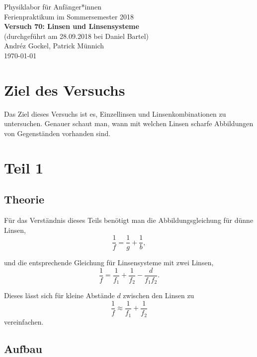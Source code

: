 \documentclass[11pt,a4paper]{article}
\begin{document}
{
\centering 
\large 
Physiklabor für Anf\"anger*innen \\
Ferienpraktikum im Sommersemester 2018 \\[4mm]
\textbf{\LARGE 
Versuch 70: Linsen und Linsensysteme
} \\[3mm]
(durchgef\"uhrt am 28.09.2018 bei Daniel Bartel) \\
Andréz Gockel, Patrick M\"unnich\\
\today \\[10mm]
}

\vspace{50pt}
\tableofcontents
\vspace{22pt}
\listoftables
\vspace{22pt}
\listoffigures
\pagebreak

\section{Ziel des Versuchs}

Das Ziel dieses Versuchs ist es, Einzellinsen und Linsenkombinationen zu untersuchen. Genauer schaut man, wann mit welchen Linsen scharfe Abbildungen von Gegenst\"anden vorhanden sind.

\section{Teil 1}

\subsection{Theorie}

F\"ur das Verst\"andnis dieses Teils ben\"otigt man die Abbildungsgleichung f\"ur d\"unne Linsen,
\begin{equation}
\frac{1}{f}=\frac{1}{g}+\frac{1}{b},\label{eq:1}
\end{equation}

und die entsprechende Gleichung f\"ur Linsensysteme mit zwei Linsen,
\begin{equation}
\frac{1}{f}=\frac{1}{f_1}+\frac{1}{f_2}-\frac{d}{f_1f_2}.\label{eq:2}
\end{equation}

Dieses l\"asst sich f\"ur kleine Abst\"ande $d$ zwischen den Linsen zu
\[
\frac{1}{f}\approx\frac{1}{f_1}+\frac{1}{f_2}
\]
vereinfachen.


\subsection{Aufbau}
\end{document}
